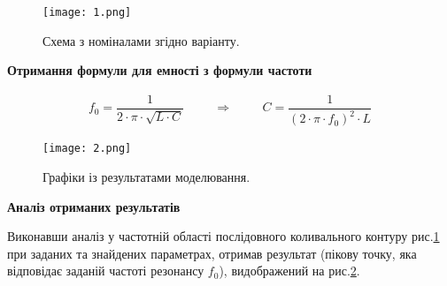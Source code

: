 \documentclass[a4paper,14pt]{extreport}
\begin{document}
\begin{figure}[h]
\begin{center}
\texttt{[image: 1.png]}
\caption{Схема з номіналами згідно варіанту.}
\label{ris1}
\end{center}
\end{figure}



\begin{center}\textbf{Отримання формули для емності з формули частоти} \end{center}

\begin{align}
f_0 = \dfrac{1}{2\cdot\pi\cdot\sqrt{L\cdot C}}\hspace{1cm} \Rightarrow \hspace{1cm} C = \dfrac{1}{(2\cdot\pi\cdot f_0)^2\cdot L}
\end{align}



\begin{figure}[h]
\begin{center}
\texttt{[image: 2.png]}
\caption{Графіки із результатами моделювання.}
\label{ris2}
\end{center}
\end{figure}

\newpage
\begin{center}\textbf{Аналіз отриманих результатів} \end{center}

Виконавши аналіз у частотній області
послідовного коливального контуру рис.\ref{ris1} при заданих та знайдених параметрах, отримав результат (пікову точку, яка відповідає заданій частоті резонансу $f_0$), видображений на рис.\ref{ris2}.
\end{document}
